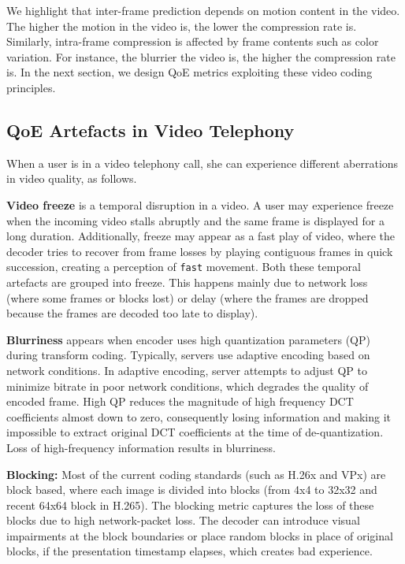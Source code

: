 We highlight that inter-frame prediction depends on motion content in the video. The higher the motion in the video is, the lower the compression rate is. Similarly, intra-frame compression is affected by frame contents such as color variation. For instance, the blurrier the video is, the higher the compression rate is. In the next section, we design QoE metrics exploiting these video coding principles.

\subsection{QoE Artefacts in Video Telephony}

When a user is in a video telephony call, she can experience different aberrations in video quality, as follows.

\noindent \textbf{Video freeze} is a temporal disruption in a video. A user may experience freeze when the incoming video stalls abruptly and the same frame is displayed for a long duration. Additionally, freeze may appear as a fast play of video, where the decoder tries to recover from frame losses by playing contiguous frames in quick succession, creating a perception of \texttt{fast} movement. Both these temporal artefacts are grouped into freeze. 
This happens mainly due to network loss (where some frames or blocks lost) or delay (where the frames are dropped because the frames are decoded too late to display). 

\noindent \textbf{Blurriness} appears when encoder uses high quantization parameters (QP) during transform coding. Typically, servers use adaptive encoding based on network conditions. In adaptive encoding, server attempts to adjust QP to minimize bitrate in poor network conditions, which degrades the quality of encoded frame. High QP reduces the magnitude of high frequency DCT coefficients almost down to zero, consequently losing information and making it impossible to extract original DCT coefficients at the time of de-quantization.  Loss of high-frequency information results in blurriness. 

\noindent \textbf{Blocking:} Most of the current coding standards (such as H.26x and VPx) are block based, where each image is divided into blocks (from 4x4 to 32x32 and recent 64x64 block in H.265). The blocking metric captures the loss of these blocks due to high network-packet loss. The decoder can introduce visual impairments at the block boundaries or place random blocks in place of original blocks, if the presentation timestamp elapses, which creates bad experience. 

